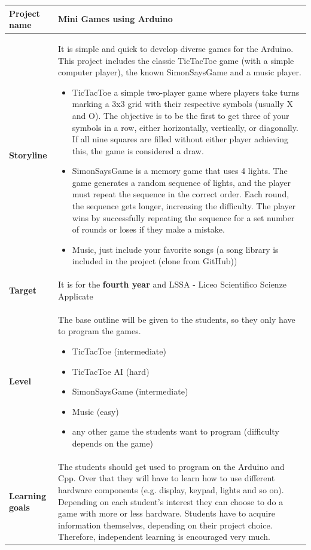 \documentclass[10pt]{article}
\begin{document}
\begin{longtable}{|p{3.5cm}|p{11cm}|}
  \hline
  \textbf{Project name} & \textbf{Mini Games} using Arduino  \\ \hline
  
  \textbf{Storyline} & It is simple and quick to develop diverse games for the Arduino. This project includes the classic TicTacToe game (with a simple computer player), the known SimonSaysGame and a music player. 
  \begin{itemize}
    \item TicTacToe a simple two-player game where players take turns marking a 3x3 grid with their respective symbols (usually X and O). The objective is to be the first to get three of your symbols in a row, either horizontally, vertically, or diagonally. If all nine squares are filled without either player achieving this, the game is considered a draw.
    \item SimonSaysGame is a memory game that uses 4 lights. The game generates a random sequence of lights, and the player must repeat the sequence in the correct order. Each round, the sequence gets longer, increasing the difficulty. The player wins by successfully repeating the sequence for a set number of rounds or loses if they make a mistake.
    \item Music, just include your favorite songs (a song library is included in the project (clone from GitHub))
  \end{itemize}\\ \hline
  
  \textbf{Target} & It is for the \textbf{fourth year} and LSSA - Liceo Scientifico Scienze Applicate \\ \hline
  
  \textbf{Level} & 
  The base outline will be given to the students, so they only have to program the games.
  \begin{itemize}
    \item TicTacToe (intermediate)
    \item TicTacToe AI (hard)
    \item SimonSaysGame (intermediate)
    \item Music (easy)
    \item any other game the students want to program (difficulty depends on the game)
  \end{itemize} \\ \hline
  
  \textbf{Learning goals} & The students should get used to program on the Arduino and Cpp. Over that they will have to learn how to use different hardware components (e.g. display, keypad, lights and so on). Depending on each student's interest they can choose to do a game with more or less hardware. Students have to acquire information themselves, depending on their project choice. Therefore, independent learning is encouraged very much. \\ \hline
  

\end{longtable}
\end{document}
